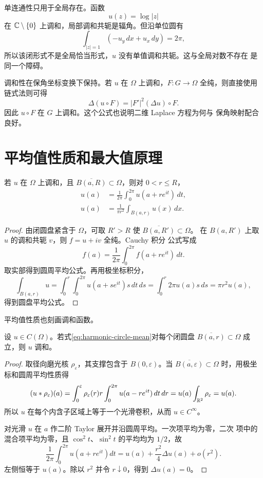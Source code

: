 单连通性只用于全局存在。函数
\[
 u(z)=\log|z|
\]
在 $\mathbb{C}\setminus\{0\}$ 上调和，局部调和共轭是辐角。但沿单位圆有
\[
 \int_{|z|=1}(-u_y\,dx+u_x\,dy)=2\pi,
\]
所以该闭形式不是全局恰当形式，$u$ 没有单值调和共轭。这与全局对数不存在
是同一个障碍。

调和性在保角坐标变换下保持。若 $u$ 在 $\Omega$ 上调和，$F:G\to\Omega$
全纯，则直接使用链式法则可得
\begin{equation}\label{eq:laplacian-conformal-change}
 \Delta(u\circ F)=|F'|^2(\Delta u)\circ F.
\end{equation}
因此 $u\circ F$ 在 $G$ 上调和。这个公式也说明二维 Laplace 方程为何与
保角映射配合良好。

\section{平均值性质和最大值原理}

\begin{theorem}[平均值性质]\label{thm:harmonic-mean-value}
若 $u$ 在 $\Omega$ 上调和，且
$\overline{B(a,R)}\subset\Omega$，则对 $0<r\le R$，
\begin{align}
 u(a)&=\frac1{2\pi}\int_0^{2\pi}u(a+re^{it})\,dt,
 \label{eq:harmonic-circle-mean}\\
 u(a)&=\frac1{\pi r^2}\int_{B(a,r)}u(x)\,dx.
 \label{eq:harmonic-disk-mean}
\end{align}
\end{theorem}

\begin{proof}
由闭圆盘紧含于 $\Omega$，可取 $R'>R$ 使 $\overline{B(a,R')}\subset\Omega$。
在 $B(a,R')$ 上取 $u$ 的调和共轭 $v$，则 $f=u+iv$ 全纯。Cauchy 积分
公式写成
\[
 f(a)=\frac1{2\pi}\int_0^{2\pi}f(a+re^{it})\,dt.
\]
取实部得到圆周平均公式。再用极坐标积分，
\[
 \int_{B(a,r)}u
 =\int_0^r\int_0^{2\pi}u(a+se^{it})s\,dt\,ds
 =\int_0^r2\pi u(a)s\,ds
 =\pi r^2u(a),
\]
得到圆盘平均公式。
\end{proof}

平均值性质也刻画调和函数。

\begin{theorem}[平均值刻画]\label{thm:harmonic-mean-value-converse}
设 $u\in C(\Omega)$。若式\eqref{eq:harmonic-circle-mean}对每个闭圆盘
$\overline{B(a,r)}\subset\Omega$ 成立，则 $u$ 调和。
\end{theorem}

\begin{proof}
取径向磨光核 $\rho_\varepsilon$，其支撑包含于 $B(0,\varepsilon)$。当
$\overline{B(a,\varepsilon)}\subset\Omega$ 时，用极坐标和圆周平均性质得
\[
 (u*\rho_\varepsilon)(a)
 =\int_0^\varepsilon \rho_\varepsilon(r)r
 \int_0^{2\pi}u(a-re^{it})\,dt\,dr
 =u(a)\int_{\mathbb{R}^2}\rho_\varepsilon=u(a).
\]
所以 $u$ 在每个内含子区域上等于一个光滑卷积，从而 $u\in C^\infty$。

对光滑 $u$ 在 $a$ 作二阶 Taylor 展开并沿圆周平均。一次项平均为零，二次
项中的混合项平均为零，且 $\cos^2t$、$\sin^2t$ 的平均均为 $1/2$，故
\[
 \frac1{2\pi}\int_0^{2\pi}u(a+re^{it})dt
 =u(a)+\frac{r^2}{4}\Delta u(a)+o(r^2).
\]
左侧恒等于 $u(a)$。除以 $r^2$ 并令 $r\downarrow0$，得到
$\Delta u(a)=0$。
\end{proof}

